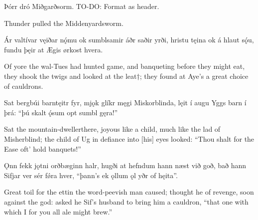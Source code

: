 Þórr dró Miðgarðsorm. TO-DO: Format as header.

Thunder pulled the Middenyardsworm.\footnotemark[1]

Ár valtívar \hld vęiðar nǫ́mu
ok sumblsamir \hld áðr saðir yrði,
hristu tęina \hld ok á hlaut sǫ́u,
fundu þęir at Ægis \hld ørkost hvera.

Of yore the wal-Tues had hunted game\footnotemark[1], and banqueting before they might eat\footnotemark[1], they shook the twigs and looked at the leat†\footnotemark[3]; they found at Aye’s a great choice of cauldrons.\footnotemark[4]

Sat bergbúi \hld barntęitr fyr,
mjǫk glíkr męgi \hld Miskorblinda,
lęit í augu \hld Yggs barn í þrá:
“þú skalt ǫ́sum \hld opt sumbl gęra!”

Sat the mountain-dweller\footnotemark[1] there, joyous like a child, much like the lad of Misherblind\footnotemark[2]; the child of Ug in defiance into [his] eyes looked: “Thou shalt for the Ease oft’ hold banquets!”\footnotemark[3]

Ǫnn fekk jǫtni \hld orðbæginn halr,
hugði at hefndum \hld hann næst við goð,
bað hann Sifjar ver \hld sér fǿra hver,
“þann’s ek ǫllum ǫl \hld yðr of hęita”.

Great toil for the ettin the word-peevish man caused; thought he of revenge, soon against the god: asked he Sif’s husband to bring him a cauldron, “that one with which I for you all ale might brew.”\footnotemark[1]

